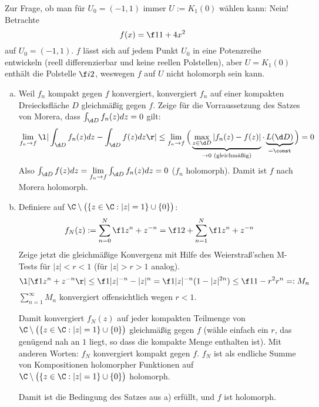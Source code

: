 \documentclass[a4paper]{scrartcl}
\begin{document}
\begin{aufgabe}
		\newpage
		Zur Frage, ob man für $U_0 = (-1,1)$ immer $U:=K_1(0)$ wählen kann: 
		Nein! Betrachte
		\[
			f(x) = \f 1{1+4x^2}
		\]
		auf $U_0 = (-1,1)$.
		$f$ lässt sich auf jedem Punkt $U_0$ in eine Potenzreihe entwickeln (reell differenzierbar und keine reellen Polstellen), aber $U=K_1(0)$ enthält die Polstelle $\f i2$, weswegen $f$ auf $U$ nicht holomorph sein kann.
	\end{aufgabe}

	\begin{aufgabe}
		\begin{enumerate}[a)]
			\item
				Weil $f_n$ kompakt gegen $f$ konvergiert, konvergiert $f_n$ auf einer kompakten Dreiecksfläche $D$ gleichmäßig gegen $f$.
				Zeige für die Vorraussetzung des Satzes von Morera, dass $\int_{\d D}f_n(z)dz = 0$ gilt:
				\begin{align*}
					\lim_{f_n\to f} \l| \int_{\d D}f_n(z) dz - \int_{\d D}f(z) dz \r|
					\le \lim_{f_n \to f} \Big( \underbrace{\max_{z\in \d D}|f_n(z) - f(z)|}_{\to 0 \text{ (gleichmäßig)}} \cdot \underbrace{L(\d D)}_{=\const} \Big) = 0
				\end{align*}								
				Also $\int_{\d D}f(z) dz = \lim\limits_{f_n\to f} \int_{\d D}f_n(z) dz = 0$ ($f_n$ holomorph).
				Damit ist $f$ nach Morera holomorph.
			\item
				Definiere auf $\C\setminus \big(\{z\in \C : |z| = 1 \}\cup \{0\}\big)$:
				\[
					f_N(z) := \sum_{n=0}^N \f 1{z^n + z^{-n}} = \f 12 + \sum_{n=1}^N \f 1{z^n + z^{-n}}
				\]
				Zeige jetzt die gleichmäßige Konvergenz mit Hilfe des Weierstraß'schen M-Tests für $|z|< r <1$ (für $|z|>r >1$ analog).
				\[
					\l | \f 1{z^n+z^{-n}} \r| \le \f 1{|z|^{-n}-|z|^n} = \f 1{|z|^{-n}(1-|z|^{2n})} \le \f 1{1-r^2} r^n =: M_n
				\]
				$\sum_{n=1}^\infty M_n$ konvergiert offensichtlich wegen $r<1$.

				Damit konvergiert $f_N(z)$ auf jeder kompakten Teilmenge von $\C\setminus \big(\{z\in \C : |z| = 1 \}\cup \{0\}\big)$ gleichmäßig gegen $f$ (wähle einfach ein $r$, das genügend nah an $1$ liegt, so dass die kompakte Menge enthalten ist).
				Mit anderen Worten: $f_N$ konvergiert kompakt gegen $f$.
				$f_N$ ist als endliche Summe von Kompositionen holomorpher Funktionen auf $\C\setminus \big(\{z\in \C : |z| = 1 \}\cup \{0\}\big)$ holomorph.

				Damit ist die Bedingung des Satzes aus a) erfüllt, und $f$ ist holomorph.


\end{enumerate}
\end{aufgabe}
\end{document}
